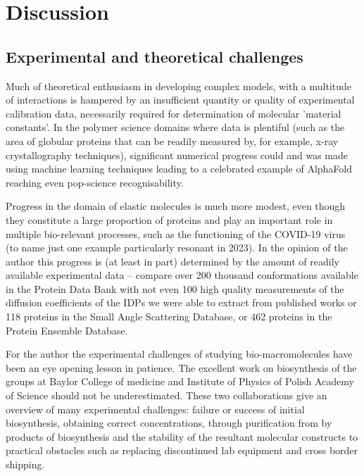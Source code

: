 \documentclass{doctoral}
\begin{document}
\chapter{Discussion}
\section{Experimental and theoretical challenges}
Much of theoretical enthusiasm in developing complex models, with a multitude of interactions is hampered by an insufficient quantity or quality of experimental calibration data, necessarily required for determination of molecular 'material constants'.
In the polymer science domains where data is plentiful (such as the area of globular proteins that can be readily measured by, for example, x-ray crystallography techniques), significant numerical progress could and was made using machine learning techniques leading to a celebrated example of AlphaFold \cite{Jumper_2021} reaching even pop-science recognisability.

Progress in the domain of elastic molecules is much more modest, even though they constitute a large proportion of proteins\cite{Ward_2004} and play an important role in multiple bio-relevant processes, such as the functioning of the COVID-19 virus\cite{Rozycki_2022} (to name just one example particularly resonant in 2023).
In the opinion of the author this progress is (at least in part) determined by the amount of readily available experimental data -- compare over 200 thousand conformations available in the Protein Data Bank\cite{rcsb_org} with not even 100 high quality measurements of the diffusion coefficients of the IDPs we were able to extract from published works\cite{Waszkiewicz_2024_mda} or 118 proteins in the Small Angle Scattering Database\cite{sasdb_org}, or 462 proteins in the Protein Ensemble Database\cite{proteinensemble_org}.

For the author the experimental challenges of studying bio-macromolecules have been an eye opening lesson in patience.
The excellent work on biosynthesis of the groups at Baylor College of medicine and Institute of Physics of Polish Academy of Science should not be underestimated.
These two collaborations give an overview of many experimental challenges: failure or success of initial biosynthesis, obtaining correct concentrations, through purification from by products of biosynthesis and the stability of the resultant molecular constructs to practical obstacles such as replacing discontinued lab equipment and cross border shipping.
\end{document}

